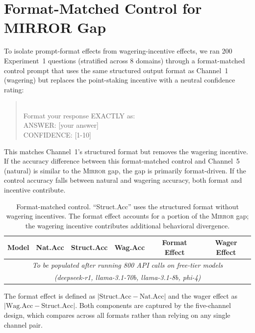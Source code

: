 \documentclass[10pt]{article}
\newcommand{\mirror}{\textsc{Mirror}}
\begin{document}
\section{Format-Matched Control for MIRROR Gap}
\label{app:format-control}

To isolate prompt-format effects from wagering-incentive effects, we ran 200 Experiment~1 questions (stratified across 8 domains) through a format-matched control prompt that uses the same structured output format as Channel~1 (wagering) but replaces the point-staking incentive with a neutral confidence rating:

\begin{quote}\small{}\\[4pt]
Format your response EXACTLY as:\\
ANSWER: [your answer]\\
CONFIDENCE: [1-10]
\end{quote}

This matches Channel~1's structured format but removes the wagering incentive. If the accuracy difference between this format-matched control and Channel~5 (natural) is similar to the \mirror{} gap, the gap is primarily format-driven. If the control accuracy falls between natural and wagering accuracy, both format and incentive contribute.

\begin{table}[h]
\centering
\caption{Format-matched control. ``Struct.Acc'' uses the structured format without wagering incentives. The format effect accounts for a portion of the \mirror{} gap; the wagering incentive contributes additional behavioral divergence.}
\label{tab:format-control}
\small
\begin{tabular}{lccccc}
\toprule
Model & Nat.Acc & Struct.Acc & Wag.Acc & Format Effect & Wager Effect \\
\midrule
\multicolumn{6}{c}{\textit{To be populated after running 800 API calls on free-tier models}} \\
\multicolumn{6}{c}{\textit{(deepseek-r1, llama-3.1-70b, llama-3.1-8b, phi-4)}} \\
\bottomrule
\end{tabular}
\end{table}

The format effect is defined as $|\text{Struct.Acc} - \text{Nat.Acc}|$ and the wager effect as $|\text{Wag.Acc} - \text{Struct.Acc}|$. Both components are captured by the five-channel design, which compares across all formats rather than relying on any single channel pair.
\end{document}
